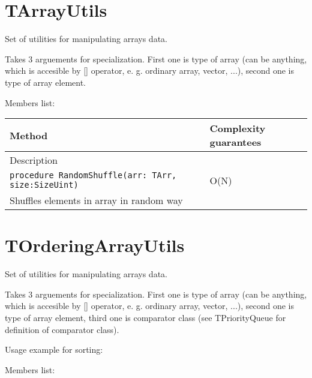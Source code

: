 \chapter{TArrayUtils}

Set of utilities for manipulating arrays data.

Takes 3 arguements for specialization. First one is type of array (can be anything, which is
accesible by [] operator, e. g. ordinary array, vector, ...), second one is type of array element.


%

Members list:

\begin{longtable}{|m{10cm}|m{5cm}|}
\hline
Method & Complexity guarantees \\ \hline
\multicolumn{2}{|m{15cm}|}{Description} \\ \hline\hline

\verb!procedure RandomShuffle(arr: TArr, size:SizeUint)! &
O(N)\\ \hline
\multicolumn{2}{|m{15cm}|}{Shuffles elements in array in random way} \\\hline\hline

\end{longtable}\chapter{TOrderingArrayUtils}

Set of utilities for manipulating arrays data.

Takes 3 arguements for specialization. First one is type of array (can be anything, which is
accesible by [] operator, e. g. ordinary array, vector, ...), second one is type of array element,
third one is comparator class (see TPriorityQueue for definition of comparator class).

Usage example for sorting:



Members list:

